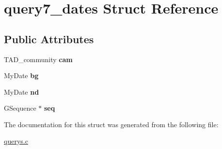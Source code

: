 \hypertarget{structquery7__dates}{}\section{query7\+\_\+dates Struct Reference}
\label{structquery7__dates}
\subsection*{Public Attributes}
\begin{DoxyCompactItemize}
\item 
T\+A\+D\+\_\+community {\bfseries cam}\hypertarget{structquery7__dates_a8d11eab2a4f05a51ca8ab8903703c2ef}{}\label{structquery7__dates_a8d11eab2a4f05a51ca8ab8903703c2ef}

\item 
My\+Date {\bfseries bg}\hypertarget{structquery7__dates_a3c7613bb5ce8f1686a4e20070b965d7b}{}\label{structquery7__dates_a3c7613bb5ce8f1686a4e20070b965d7b}

\item 
My\+Date {\bfseries nd}\hypertarget{structquery7__dates_a071531f156e93485248db4207d02e661}{}\label{structquery7__dates_a071531f156e93485248db4207d02e661}

\item 
G\+Sequence $\ast$ {\bfseries seq}\hypertarget{structquery7__dates_af9068ccef4f4693f06f6edbd7b7bba18}{}\label{structquery7__dates_af9068ccef4f4693f06f6edbd7b7bba18}

\end{DoxyCompactItemize}


The documentation for this struct was generated from the following file\+:\begin{DoxyCompactItemize}
\item 
\hyperlink{querys_8c}{querys.\+c}\end{DoxyCompactItemize}
